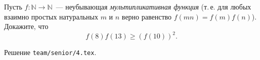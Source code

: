 \problem{}
Пусть $f \colon \mathbb{N} \to \mathbb{N}$~--- неубывающая
\emph{мультипликативная функция}
(т.\,е. для любых взаимно простых натуральных $m$ и $n$ верно равенство
$f(m n) = f(m) f(n)$).
Докажите, что
\[
    f(8) f(13) \geq (f(10))^2
.\]

\solution
Решение \texttt{team/senior/4.tex}.
\endproblem

